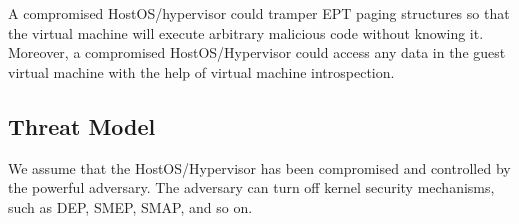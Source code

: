 A compromised HostOS/hypervisor could tramper EPT paging structures so that the virtual machine will execute arbitrary malicious code without knowing it. 
Moreover, a compromised HostOS/Hypervisor could access any data in the guest virtual machine with the help of virtual machine introspection.



\subsection{Threat Model} \label{sub:thretmodel}
We assume that the HostOS/Hypervisor has been compromised and controlled by the powerful adversary. The adversary can turn off kernel security mechanisms, such as DEP, SMEP, SMAP, and so on. 

















